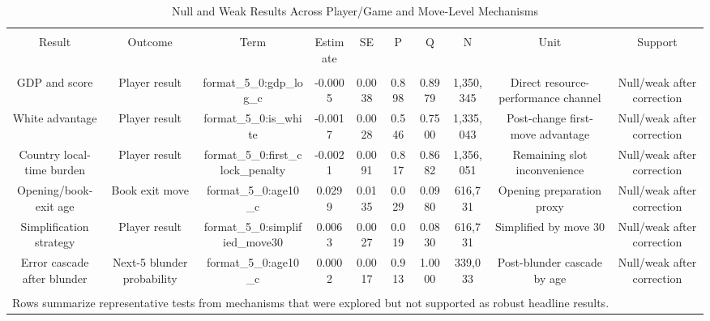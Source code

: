 
\begin{table}[!htbp] \centering 
  \caption{Null and Weak Results Across Player/Game and Move-Level Mechanisms} 
  \label{} 
\begin{tabular}{@{\extracolsep{5pt}} cccccccccc} 
\\[-1.8ex]\hline 
\hline \\[-1.8ex] 
Result & Outcome & Term & Estimate & SE & P & Q & N & Unit & Support \\ 
\hline \\[-1.8ex] 
GDP and score & Player result & format\_5\_0:gdp\_log\_c & -0.0005 & 0.0038 & 0.898 & 0.8979 & 1,350,345 & Direct resource-performance channel & Null/weak after correction \\ 
White advantage & Player result & format\_5\_0:is\_white & -0.0017 & 0.0028 & 0.546 & 0.7500 & 1,335,043 & Post-change first-move advantage & Null/weak after correction \\ 
Country local-time burden & Player result & format\_5\_0:first\_clock\_penalty & -0.0021 & 0.0091 & 0.817 & 0.8682 & 1,356,051 & Remaining slot inconvenience & Null/weak after correction \\ 
Opening/book-exit age & Book exit move & format\_5\_0:age10\_c & 0.0299 & 0.0135 & 0.029 & 0.0980 & 616,731 & Opening preparation proxy & Null/weak after correction \\ 
Simplification strategy & Player result & format\_5\_0:simplified\_move30 & 0.0063 & 0.0027 & 0.019 & 0.0830 & 616,731 & Simplified by move 30 & Null/weak after correction \\ 
Error cascade after blunder & Next-5 blunder probability & format\_5\_0:age10\_c & 0.0002 & 0.0017 & 0.913 & 1.0000 & 339,033 & Post-blunder cascade by age & Null/weak after correction \\ 
\hline \\[-1.8ex] 
\multicolumn{10}{l}{Rows summarize representative tests from mechanisms that were explored but not supported as robust headline results.} \\ 
\end{tabular} 
\end{table} 
